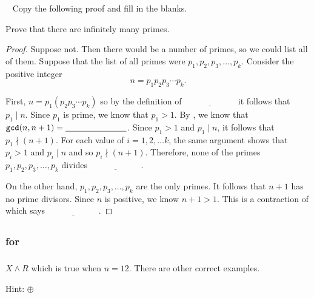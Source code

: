 \begin{exer}[\exerE] %
\label{exer_proof_inf_many_primes}
~
    Copy the following proof and fill in the blanks.
    
    Prove that there are infinitely many primes.

        \begin{proof}
            Suppose not.  Then there would be a \underline{\hspace{1in}} number of primes, so we could list all of them. Suppose that the list of all primes were $p_1,p_2,p_3, \ldots,p_k.$ Consider the positive integer $$n = p_1p_2p_3\cdots p_k.$$  

            First, $n = p_1(p_2p_3\cdots p_k)$ so by the definition of $\underline{\hspace{1in}}$ it follows that $p_1 \mid n$.  Since $p_1$ is prime, we know that $p_1 > 1$.  By , we know that $\texttt{gcd}(n,n+1) = \underline{\hspace{1in}}$. Since $p_1 > 1$ and $p_1 \mid n$, it follows that $p_1 \nmid (n+1)$.  For each value of $i = 1, 2, \ldots k$, the same argument shows that $p_i >1$ and $p_i \mid n$ and so $p_i \nmid (n+1)$. Therefore, none of the primes $p_1,p_2,p_3, \ldots, p_k$ divides $\underline{\hspace{1in}}$.  
            
            On the other hand, $p_1,p_2,p_3, \ldots,p_k$ are the only primes.  It follows that $n+1$ has no prime divisors. Since $n$ is positive, we know $n+1>1$. This is a contraction of  which says $\underline{\hspace{1in}}$.
        \end{proof}
\end{exer}

\subsection{\answers}

\subsubsection{\answers for  \subandor}

\subsubsection*{ \answers}
\begin{apart}
    \item $X \land R$ which is true when $n=12$. There are other correct examples.
    \item Hint: $\oplus$
\end{apart}

